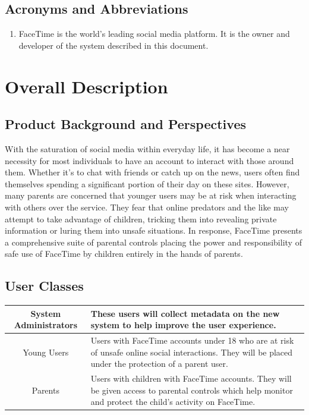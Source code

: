 \documentclass[12pt]{article}
\begin{document}
\subsection{Acronyms and Abbreviations}

\begin{enumerate}
    \item FaceTime is the world’s leading social media platform. It is the owner and developer of the system
    described in this document.
\end{enumerate}

\section{Overall Description}

\subsection{Product Background and Perspectives}

With the saturation of social media within everyday life, it has become a near necessity for most individuals to
have an account to interact with those around them. Whether it’s to chat with friends or catch up on the news, users
often find themselves spending a significant portion of their day on these sites. However, many parents are concerned
that younger users may be at risk when interacting with others over the service. They fear that online predators and
the like may attempt to take advantage of children, tricking them into revealing private information or luring them
into unsafe situations. In response, FaceTime presents a comprehensive suite of parental controls placing the power
and responsibility of safe use of FaceTime by children entirely in the hands of parents.

\subsection{User Classes}

\begin{center}
    \begin{tabularx}{\linewidth}{|c|X|}
        \hline
        System Administrators & These users will collect metadata on the new system to help improve the user
        experience. \\
        \hline
        Young Users & Users  with FaceTime accounts under 18 who are at risk of unsafe online social interactions.
        They will be placed under the protection of a parent user.\\
        \hline
        Parents & Users with children with FaceTime accounts. They will be given access to parental controls which
        help monitor and protect the child’s activity on FaceTime.\\
        \hline
    \end{tabularx}
\end{center}
\end{document}
